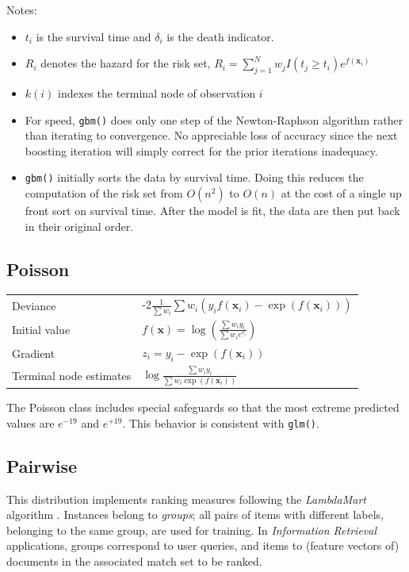 \documentclass{article}
\begin{document}
Notes: 
\begin{itemize} 
\item $t_i$ is the survival time and $\delta_i$ is the death
  indicator.
\item $R_i$ denotes the hazard for the risk set, $R_i=\sum_{j=1}^N
  w_jI(t_j\geq t_i)e^{f(\mathbf{x}_i)}$
\item $k(i)$ indexes the terminal node of observation $i$
\item For speed, \texttt{gbm()} does only one step of the
  Newton-Raphson algorithm rather than iterating to convergence. No
  appreciable loss of accuracy since the next boosting iteration will
  simply correct for the prior iterations inadequacy.
\item \texttt{gbm()} initially sorts the data by survival time. Doing
  this reduces the computation of the risk set from $O(n^2)$ to $O(n)$
  at the cost of a single up front sort on survival time. After the
  model is fit, the data are then put back in their original order.
\end{itemize}

\subsection{Poisson} 
\begin{tabular}{ll} 
Deviance & -2$\frac{1}{\sum w_i} \sum w_i(y_if(\mathbf{x}_i)-\exp(f(\mathbf{x}_i)))$ \\ 
Initial value & $\displaystyle f(\mathbf{x})= \log\left(\frac{\sum w_iy_i}{\sum w_ie^{o_i}}\right)$ \\
Gradient & $z_i=y_i - \exp(f(\mathbf{x}_i))$ \\ 
Terminal node estimates & $\displaystyle \log\frac{\sum w_iy_i}{\sum w_i\exp(f(\mathbf{x}_i))}$ 
\end{tabular}

The Poisson class includes special safeguards so that the most extreme
predicted values are $e^{-19}$ and $e^{+19}$. This behavior is
consistent with \texttt{glm()}.


\subsection{Pairwise}

This distribution implements ranking measures following the
\emph{LambdaMart} algorithm \cite{Burges:2010}. Instances belong to
\emph{groups}; all pairs of items with different labels, belonging to
the same group, are used for training. In \emph{Information Retrieval}
applications, groups correspond to user queries, and items to (feature
vectors of) documents in the associated match set to be ranked.
\end{document}
